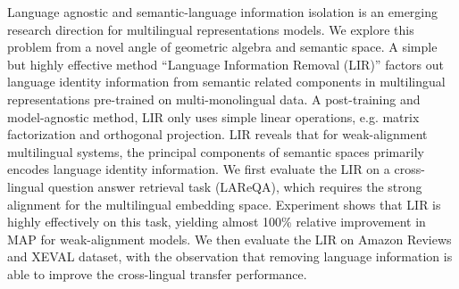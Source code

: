 Language agnostic and semantic-language information isolation is an emerging research direction for multilingual representations models. We explore this problem from a novel angle of geometric algebra and semantic space. A simple but highly effective method ``Language Information Removal (LIR)'' factors out language identity information from semantic related components in multilingual representations pre-trained on multi-monolingual data. A post-training and model-agnostic method, LIR only uses simple linear operations, e.g. matrix factorization and orthogonal projection. LIR reveals that for weak-alignment multilingual systems, the principal components of semantic spaces primarily encodes language identity information. We first evaluate the LIR on a cross-lingual question answer retrieval task (LAReQA), which requires the strong alignment for the multilingual embedding space. Experiment shows that LIR is highly effectively on this task, yielding almost 100\% relative improvement in MAP for weak-alignment models. We then evaluate the LIR on Amazon Reviews and XEVAL dataset, with the observation that removing language information is able to improve the cross-lingual transfer performance.
